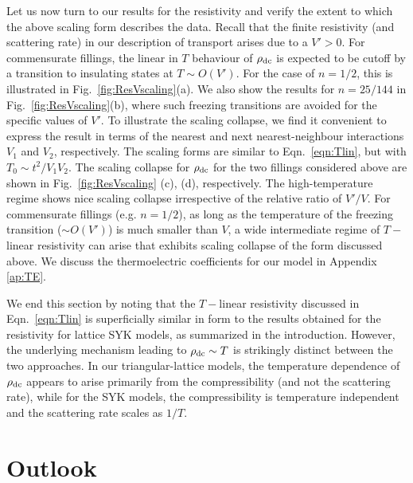 \documentclass[aps,prx,onecolumn,amsmath,nofootinbib,amssymb,11pt]{revtex4-1}
\def \tn {\textnormal}
\def \rd {\rho_{\tn{dc}}}
\begin{document}
{Let us now turn to our results for the resistivity and verify the extent to which the above scaling form describes the data. Recall that the finite resistivity (and scattering rate) in our description of transport arises due to a $V'>0$. For commensurate fillings, the linear in $T$ behaviour of $\rd $ is expected to be cutoff by a transition to insulating states at $T\sim O(V')$. For the case of $n=1/2$, this is illustrated in Fig.~\ref{fig:ResVscaling}(a). We also show the results for $n=25/144$ in Fig.~\ref{fig:ResVscaling}(b), where such freezing transitions are avoided for the specific values of $V'$. To illustrate the scaling collapse, we find it convenient to express the result in terms of the nearest and next nearest-neighbour interactions $V_1$ and $V_2$, respectively. The scaling forms are similar to Eqn.~\ref{eqn:Tlin}, but with $T_0\sim t^2/V_1 V_2$. The scaling collapse for $\rd$ for the two fillings considered above are shown in Fig.~\ref{fig:ResVscaling} (c), (d), respectively. The high-temperature regime shows nice scaling collapse irrespective of the relative ratio of $V'/V$. For  commensurate fillings (e.g. $n=1/2$), as long as the temperature of the freezing transition ($\sim O(V')$) is much smaller than $V$, a wide intermediate regime of $T-$linear resistivity can arise that exhibits scaling collapse of the form discussed above. We discuss the thermoelectric coefficients for our model in Appendix \ref{ap:TE}.  


We end this section by noting that the $T-$linear resistivity discussed in Eqn.~\ref{eqn:Tlin} is superficially similar in form to the results obtained for the resistivity for lattice SYK models, as summarized in the introduction. However, the underlying mechanism leading to $\rd\sim T$ is strikingly distinct between the two approaches. In our triangular-lattice models, the temperature dependence of $\rd$ appears to arise primarily from the compressibility (and not the scattering rate), while for the SYK models, the compressibility is temperature independent and the scattering rate scales as $1/T$. 


\section{\textsf{Outlook}}
\label{sec:outlook}

}
\end{document}
